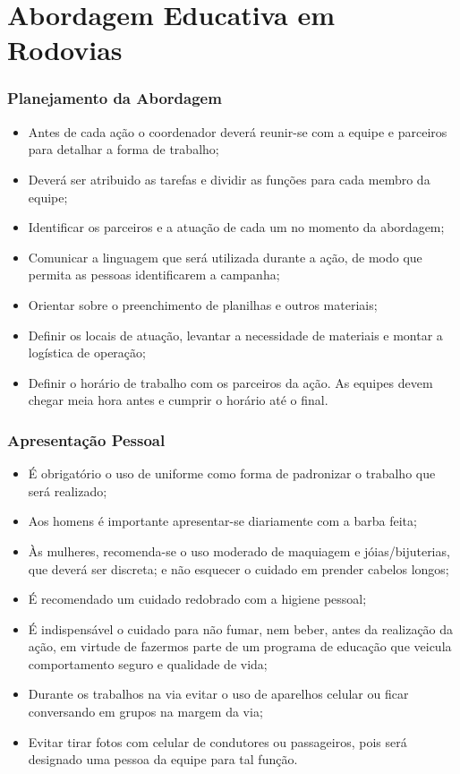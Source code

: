 \chapter{Abordagem Educativa em Rodovias}
\subsection{Planejamento da Abordagem}

\begin{itemize}
\item Antes de cada ação o coordenador deverá reunir-se com a equipe e parceiros para detalhar a forma de  trabalho;
\item Deverá ser atribuido as tarefas e dividir as funções para cada membro da equipe;
\item Identificar os parceiros e a atuação de cada um no momento da abordagem;
\item Comunicar a linguagem que será utilizada durante a ação, de modo que permita as pessoas identificarem a campanha;
\item Orientar sobre o preenchimento de planilhas e outros materiais;
\item Definir os locais de atuação, levantar a necessidade de materiais e montar a logística de operação;
\item Definir o horário de trabalho com os parceiros da ação. As equipes devem chegar meia hora antes e cumprir o horário até o final.  
\end{itemize}

\subsection{Apresentação Pessoal}

\begin{itemize}
\item É obrigatório o uso de uniforme como forma de padronizar o trabalho que será realizado;
\item Aos homens é importante apresentar-se diariamente com a barba feita;
\item Às mulheres, recomenda-se o uso moderado de maquiagem e jóias/bijuterias, que deverá ser discreta; e não esquecer o cuidado em prender cabelos longos;
\item É recomendado um cuidado redobrado com a higiene pessoal;
\item É indispensável o cuidado para não fumar, nem beber, antes da realização da ação, em virtude de fazermos parte de um programa de educação que veicula comportamento seguro e qualidade de vida;
\item Durante os trabalhos na via evitar o uso de aparelhos celular ou ficar conversando em grupos na margem da via;
\item Evitar tirar fotos com celular de condutores ou passageiros, pois será designado uma pessoa da equipe para tal função.
\end{itemize}



